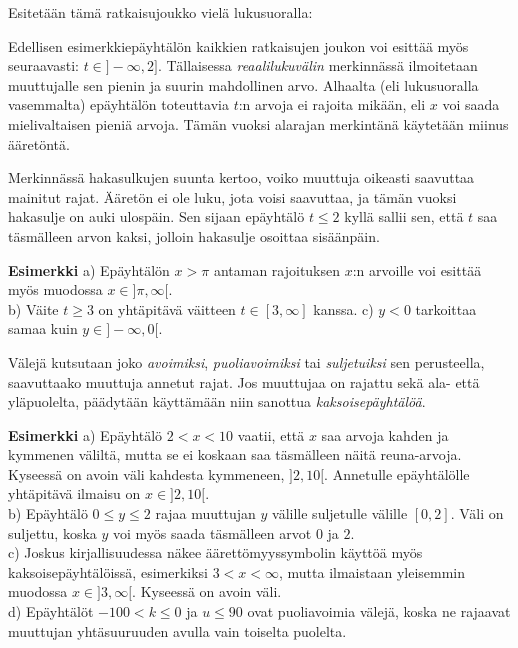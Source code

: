 Esitetään tämä ratkaisujoukko vielä lukusuoralla:

\begin{lukusuora}{-6}{10}{6}
\end{lukusuora}

Edellisen esimerkkiepäyhtälön kaikkien ratkaisujen joukon voi esittää myös seuraavasti: $t\in ]-\infty, 2]$. Tällaisessa \emph{reaalilukuvälin} merkinnässä ilmoitetaan muuttujalle sen pienin ja suurin mahdollinen arvo. Alhaalta (eli lukusuoralla vasemmalta) epäyhtälön toteuttavia $t$:n arvoja ei rajoita mikään, eli $x$ voi saada mielivaltaisen pieniä arvoja. Tämän vuoksi alarajan merkintänä käytetään miinus ääretöntä.

Merkinnässä hakasulkujen suunta kertoo, voiko muuttuja oikeasti saavuttaa mainitut rajat. Ääretön ei ole luku, jota voisi saavuttaa, ja tämän vuoksi hakasulje on auki ulospäin. Sen sijaan epäyhtälö $t \leq 2$ kyllä sallii sen, että $t$ saa täsmälleen arvon kaksi, jolloin hakasulje osoittaa sisäänpäin.

\textbf{Esimerkki}
a) Epäyhtälön $x>\pi$ antaman rajoituksen $x$:n arvoille voi esittää myös muodossa $x \in ]\pi, \infty [$. \\
b) Väite $t \geq 3$ on yhtäpitävä väitteen $t \in [3, \infty]$ kanssa.
c) $y<0$ tarkoittaa samaa kuin $y \in ]-\infty,0[$.

Välejä kutsutaan joko \emph{avoimiksi}, \emph{puoliavoimiksi} tai \emph{suljetuiksi} sen perusteella, saavuttaako muuttuja annetut rajat. Jos muuttujaa on rajattu sekä ala- että yläpuolelta, päädytään käyttämään niin sanottua \emph{kaksoisepäyhtälöä}.

\textbf{Esimerkki}
a) Epäyhtälö $2<x<10$ vaatii, että $x$ saa arvoja kahden ja kymmenen väliltä, mutta se ei koskaan saa täsmälleen näitä reuna-arvoja. Kyseessä on avoin väli kahdesta kymmeneen, $]2,10[$. Annetulle epäyhtälölle yhtäpitävä ilmaisu on $x \in ]2,10[$. \\
b) Epäyhtälö $0\leq y \leq 2$ rajaa muuttujan $y$ välille suljetulle välille $[0,2]$. Väli on suljettu, koska $y$ voi myös saada täsmälleen arvot $0$ ja $2$. \\
c) Joskus kirjallisuudessa näkee äärettömyyssymbolin käyttöä myös kaksoisepäyhtälöissä, esimerkiksi $3<x<\infty $, mutta ilmaistaan yleisemmin muodossa $x \in ]3,\infty[$. Kyseessä on avoin väli. \\
d) Epäyhtälöt $-100<k\leq 0$ ja $u\leq 90$ ovat puoliavoimia välejä, koska ne rajaavat muuttujan yhtäsuuruuden avulla vain toiselta puolelta. \\

